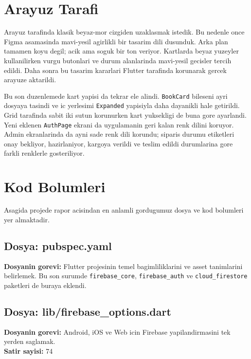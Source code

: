 \documentclass[12pt,a4paper]{article}
\begin{document}
\section{Arayuz Tarafi}

Arayuz tarafinda klasik beyaz-mor cizgiden uzaklasmak istedik. Bu nedenle once Figma asamasinda mavi-yesil agirlikli bir tasarim dili dusunduk. Arka plan tamamen koyu degil; acik ama soguk bir ton veriyor. Kartlarda beyaz yuzeyler kullanilirken vurgu butonlari ve durum alanlarinda mavi-yesil gecisler tercih edildi. Daha sonra bu tasarim kararlari Flutter tarafinda korunarak gercek arayuze aktarildi.

Bu son duzenlemede kart yapisi da tekrar ele alindi. \verb|BookCard| bileseni ayri dosyaya tasindi ve ic yerlesimi \verb|Expanded| yapisiyla daha dayanikli hale getirildi. Grid tarafinda sabit iki sutun korunurken kart yuksekligi de buna gore ayarlandi. Yeni eklenen \verb|AuthPage| ekrani da uygulamanin geri kalan renk dilini koruyor. Admin ekranlarinda da ayni sade renk dili korundu; siparis durumu etiketleri onay bekliyor, hazirlaniyor, kargoya verildi ve teslim edildi durumlarina gore farkli renklerle gosteriliyor.

\section{Kod Bolumleri}

Asagida projede rapor acisindan en anlamli gordugumuz dosya ve kod bolumleri yer almaktadir.

\subsection{Dosya: pubspec.yaml}

\textbf{Dosyanin gorevi:} Flutter projesinin temel bagimliliklarini ve asset tanimlarini belirlemek. Bu son surumde \verb|firebase_core|, \verb|firebase_auth| ve \verb|cloud_firestore| paketleri de buraya eklendi.



\subsection{Dosya: lib/firebase\_options.dart}

\textbf{Dosyanin gorevi:} Android, iOS ve Web icin Firebase yapilandirmasini tek yerden saglamak.\\
\textbf{Satir sayisi:} 74
\end{document}
